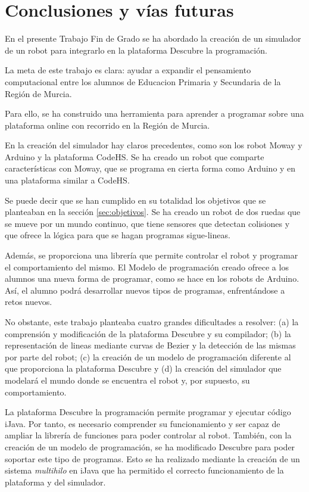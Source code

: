 \chapter{Conclusiones y vías futuras}
\label{conslusiones}


En el presente Trabajo Fin de Grado se ha abordado la creación de un simulador de un robot para integrarlo en la plataforma Descubre la programación. 

La meta de este trabajo es clara: ayudar a expandir el pensamiento computacional entre los alumnos de Educacion Primaria y Secundaria de la Región de Murcia.

Para ello, se ha construido una herramienta para aprender a programar sobre una plataforma online con recorrido en la Región de Murcia. 

En la creación del simulador hay claros precedentes, como son los robot Moway y Arduino y la plataforma CodeHS. Se ha creado un robot que comparte características con Moway, que se programa en cierta forma como Arduino y en una plataforma similar a CodeHS. 

Se puede decir que se han cumplido en su totalidad los objetivos que se planteaban en la sección \ref{sec:objetivos}. Se ha creado un robot de dos ruedas que se mueve por un mundo continuo, que tiene sensores que detectan colisiones y que ofrece la lógica para que se hagan programas sigue-lineas. 

Además, se proporciona una librería que permite controlar el robot y programar el comportamiento del mismo. El Modelo de programación creado ofrece a los alumnos una nueva forma de programar, como se hace en los robots de Arduino. Así, el alumno podrá desarrollar nuevos tipos de programas, enfrentándose a retos nuevos. 

No obstante, este trabajo planteaba cuatro grandes dificultades a resolver: (a) la comprensión y modificación de la plataforma Descubre y su compilador; (b) la representación de lineas mediante curvas de Bezier y la detección de las mismas por parte del robot; (c) la creación de un modelo de programación diferente al que proporciona la plataforma Descubre y (d) la creación del simulador que modelará el mundo donde se encuentra el robot y, por supuesto, su comportamiento.

La plataforma Descubre la programación permite programar y ejecutar código iJava. Por tanto, es necesario comprender su funcionamiento y ser capaz de ampliar la librería de funciones para poder controlar al robot. También, con la creación de un modelo de programación, se ha modificado Descubre para poder soportar este tipo de programas. Esto se ha realizado mediante la creación de un sistema \emph{multihilo} en iJava que ha permitido el correcto funcionamiento de la plataforma y del simulador. 


